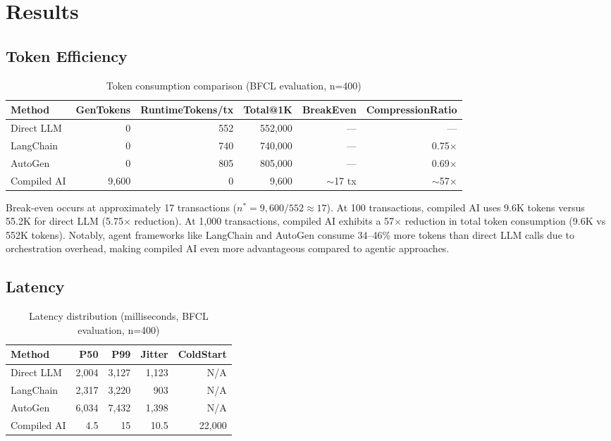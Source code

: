 \documentclass[11pt]{article}
\begin{document}
\section{Results}
\label{sec:results}

\subsection{Token Efficiency}

\begin{table}[ht]
\centering
\caption{Token consumption comparison (BFCL evaluation, n=400)}
\label{tab:token-results}
\begin{tabular}{lrrrrr}
\toprule
Method & GenTokens & RuntimeTokens/tx & Total@1K & BreakEven & CompressionRatio \\
\midrule
Direct LLM & 0 & 552 & 552,000 & --- & --- \\
LangChain & 0 & 740 & 740,000 & --- & 0.75$\times$ \\
AutoGen & 0 & 805 & 805,000 & --- & 0.69$\times$ \\
Compiled AI & 9,600 & 0 & 9,600 & $\sim$17 tx & $\sim$57$\times$ \\
\bottomrule
\end{tabular}
\end{table}

Break-even occurs at approximately 17 transactions ($n^* = 9{,}600 / 552 \approx 17$). At 100 transactions, compiled AI uses 9.6K tokens versus 55.2K for direct LLM (5.75$\times$ reduction). At 1,000 transactions, compiled AI exhibits a 57$\times$ reduction in total token consumption (9.6K vs 552K tokens). Notably, agent frameworks like LangChain and AutoGen consume 34--46\% more tokens than direct LLM calls due to orchestration overhead, making compiled AI even more advantageous compared to agentic approaches.

\subsection{Latency}

\begin{table}[ht]
\centering
\caption{Latency distribution (milliseconds, BFCL evaluation, n=400)}
\label{tab:latency-results}
\begin{tabular}{lrrrr}
\toprule
Method & P50 & P99 & Jitter & ColdStart \\
\midrule
Direct LLM & 2,004 & 3,127 & 1,123 & N/A \\
LangChain & 2,317 & 3,220 & 903 & N/A \\
AutoGen & 6,034 & 7,432 & 1,398 & N/A \\
Compiled AI & 4.5 & 15 & 10.5 & 22,000 \\
\bottomrule
\end{tabular}
\end{table}
\end{document}
